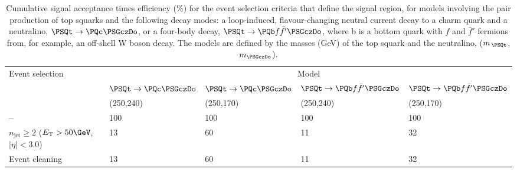 \clearpage
\newcommand{\n}{\phantom{1}}
\newcommand{\nn}{\phantom{10}}
\begin{table}[h!]
  \caption{Cumulative signal acceptance times efficiency (\%) for the
    event selection criteria that define the signal region, for models
    involving the pair production of top squarks and the following
    decay modes: a loop-induced, flavour-changing neutral current
    decay to a charm quark and a neutralino, $\PSQt \to
    \PQc\PSGczDo$, or a four-body decay, $\PSQt \to \PQb f{\bar{f}'}
    \PSGczDo$, where b is a bottom quark with $f$ and $\bar{f}'$ 
    fermions from, for example, an off-shell W boson decay. The models
    are defined by the masses (GeV) of the top squark and the
    neutralino, ($m_{\,\PSQt}$, $m_{\PSGczDo}$). 
  } 
  \centering
  \renewcommand*{\arraystretch}{1.2}
  \begin{tabular}{ lllll }
    \hline
    Event selection                                                           & \multicolumn{4}{c}{Model}               \\ 
    \cline{2-5}
                                                                              & $\PSQt\to\PQc\PSGczDo$ 
                                                                              & $\PSQt\to\PQc\PSGczDo$  
                                                                              & $\PSQt \to {\PQb f{\bar{f}'}} \PSGczDo$ 
                                                                              & $\PSQt \to {\PQb f{\bar{f}'}} \PSGczDo$ \\
                                                                              & (250,240) 
                                                                              & (250,170) 
                                                                              & (250,240)                               
                                                                              & (250,170)                               \\
                                                                  \hline
    --                                                                        & 100     & 100     & 100     & 100       \\
    $n_\text{jet} \geq 2$ ($E_\text{T} > 50\GeV$, $|\eta| < 3.0$)             & \n13    & \n60    & \n11    & \n32      \\
    Event cleaning                                                            & \n13    & \n60    & \n11    & \n32      \\

\end{tabular}
\end{table}
